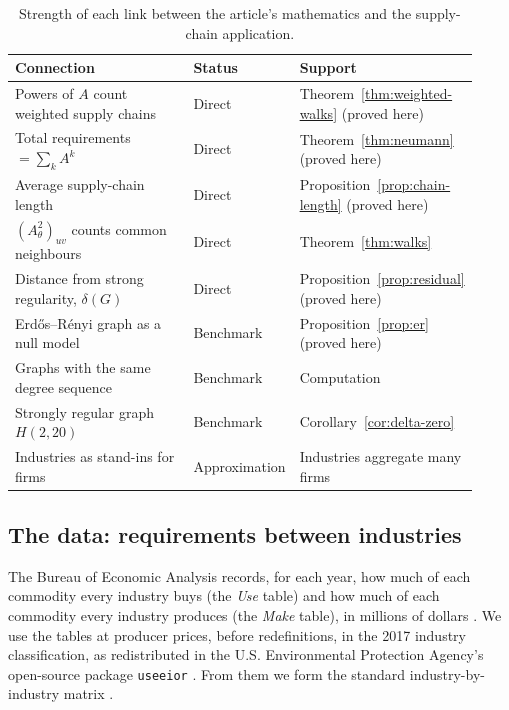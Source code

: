 \begin{table}[htbp]
\centering
\small
\caption{Strength of each link between the article's mathematics and the
supply-chain application.}
\label{tab:supply-status}
\begin{tabular}{@{}p{0.44\linewidth}p{0.17\linewidth}p{0.31\linewidth}@{}}
\toprule
Connection & Status & Support \\
\midrule
Powers of $A$ count weighted supply chains & Direct & Theorem~\ref{thm:weighted-walks} (proved here) \\
Total requirements $=\sum_k A^k$ & Direct & Theorem~\ref{thm:neumann} (proved here) \\
Average supply-chain length & Direct & Proposition~\ref{prop:chain-length} (proved here) \\
$(A_\theta^2)_{uv}$ counts common neighbours & Direct & Theorem~\ref{thm:walks} \\
Distance from strong regularity, $\delta(G)$ & Direct & Proposition~\ref{prop:residual} (proved here) \\
Erd\H{o}s--R\'enyi graph as a null model & Benchmark & Proposition~\ref{prop:er} (proved here) \\
Graphs with the same degree sequence & Benchmark & Computation \\
Strongly regular graph $H(2,20)$ & Benchmark & Corollary~\ref{cor:delta-zero} \\
Industries as stand-ins for firms & Approximation & Industries aggregate many firms \\
\bottomrule
\end{tabular}
\end{table}

\subsection{The data: requirements between industries}
\label{subsec:io-data}

The Bureau of Economic Analysis records, for each year, how much of each
commodity every industry buys (the \emph{Use} table) and how much of each
commodity every industry produces (the \emph{Make} table), in millions of
dollars \cite{horowitz2009}. We use the tables at producer prices, before
redefinitions, in the 2017 industry classification, as redistributed
in the U.S. Environmental Protection Agency's open-source package
\texttt{useeior} \cite{li2022useeior,bea2025io}. From them we form the
standard industry-by-industry matrix \cite[Ch.~5]{miller2009}.

